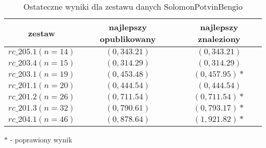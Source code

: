 \begin{frame}
\begin{table}
\centering
\caption{Ostateczne wyniki dla zestawu danych SolomonPotvinBengio}
\begin{tabular}{c|c|c}
zestaw & najlepszy opublikowany & najlepszy znaleziony \\ \hline
$rc\_205.1 (n=14)$ & $(0, 343.21)$ & $(0, 343.21)$ \\
$rc\_203.4 (n=15)$ & $(0, 314.29)$ & $(0, 314.29)$ \\
$rc\_203.1 (n=19)$ & $(0, 453.48)$ & $(0, 457.95)*$ \\
$rc\_201.1 (n=20)$ & $(0, 444.54)$ & $(0, 444.54)$ \\
$rc\_201.2 (n=26)$ & $(0, 711.54)$ & $(0, 711.54)*$ \\
$rc\_201.3 (n=32)$ & $(0, 790.61)$ & $(0, 793.17)*$ \\
$rc\_204.1 (n=46)$ & $(0, 878.64)$ & $(1, 921.82)*$ 
\end{tabular}
\end{table}
$*$ - poprawiony wynik
\end{frame}
